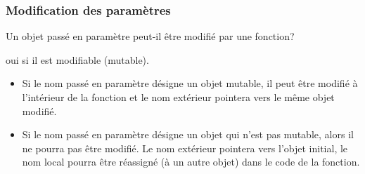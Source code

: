 \begin{frame}
  \frametitle{Modification des paramètres}
Un objet passé en paramètre peut-il être modifié par une fonction?

oui si il est modifiable (mutable).\newline
\begin{itemize}
  \item Si le nom passé en paramètre désigne un objet mutable, il peut être modifié à l'intérieur de la fonction et le nom extérieur pointera vers le même objet modifié.
  \item Si le nom passé en paramètre désigne un objet qui n'est pas mutable, alors il ne pourra pas être modifié. Le nom extérieur pointera vers l'objet initial, le nom local pourra être réassigné (à un autre objet) dans le code de la fonction. 

\end{itemize}
\end{frame}



